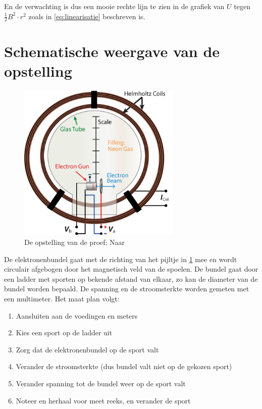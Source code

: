 \documentclass{article}
\begin{document}
En de verwachting is dus een mooie rechte lijn te zien in de grafiek van $U$ tegen $\frac{1}{2}B^2\cdot r^2$ zoals in \ref{eq:linearisatie} beschreven is.

\section{Schematische weergave van de opstelling}

\begin{figure}[H]
	\centering
	\includegraphics[width=0.7\textwidth]{opstelling.png}
	\caption{De opstelling van de proef; Naar \cite{schematic}}
	\label{fig:opstelling}
\end{figure}
De elektronenbundel gaat met de richting van het pijltje in \ref{fig:opstelling} mee en wordt circulair afgebogen door het magnetisch veld van de spoelen. De bundel gaat door een ladder met sporten op bekende afstand van elkaar, zo kan de diameter van de bundel worden bepaald. De spanning en de stroomsterkte worden gemeten met een multimeter.
Het maat plan volgt:
\begin{enumerate}
	\item Aansluiten aan de voedingen en meters
	\item Kies een sport op de ladder uit
	\item Zorg dat de elektronenbundel op de sport valt
	\item Verander de stroomsterkte (dus bundel valt niet op de gekozen sport)
	\item Verander spanning tot de bundel weer op de sport valt
	\item Noteer en herhaal voor meet reeks, en verander de sport
\end{enumerate}
\end{document}
